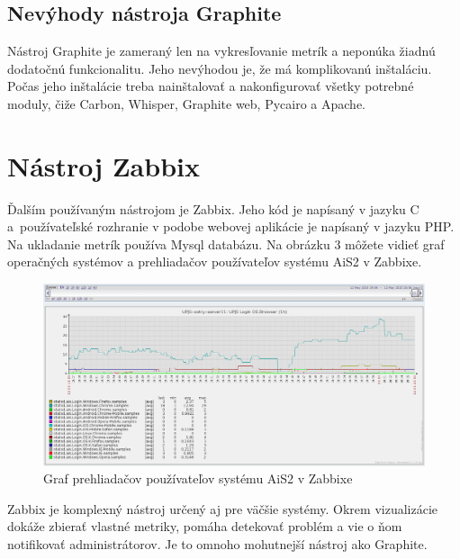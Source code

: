 \documentclass[a4paper, upjsfrontpage, thesismargins, thesislinespacing]{rnthesis}
\begin{document}
\subsection{Nevýhody nástroja Graphite}

Nástroj Graphite je zameraný len na vykresľovanie metrík a neponúka žiadnú dodatočnú funkcionalitu.
Jeho nevýhodou je, že má komplikovanú inštaláciu.
Počas jeho inštalácie treba nainštalovať a nakonfigurovať všetky potrebné moduly, čiže Carbon, Whisper, Graphite web, Pycairo a Apache.

\section{Nástroj Zabbix}

Ďalším používaným nástrojom je Zabbix.
Jeho kód je napísaný v jazyku C a~používateľské rozhranie v podobe webovej aplikácie je napísaný v jazyku PHP.
Na ukladanie metrík používa Mysql databázu.
Na obrázku 3 môžete vidieť graf operačných systémov a prehliadačov používateľov systému AiS2 v Zabbixe.

\begin{figure}
	\begin{center}
		\includegraphics[scale=0.41]{zabbix1.png}
	\end{center}
	\caption{Graf prehliadačov používateľov systému AiS2 v Zabbixe}
\end{figure}

Zabbix je komplexný nástroj určený aj pre väčšie systémy.
Okrem vizualizácie dokáže zbierať vlastné metriky, pomáha detekovať problém a vie o ňom notifikovať administrátorov.
Je to omnoho mohutnejší nástroj ako Graphite.
\end{document}

